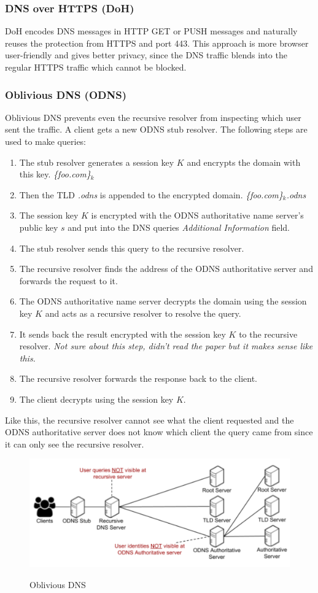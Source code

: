 \subsubsection{DNS over HTTPS (DoH)}
DoH encodes DNS messages in HTTP GET or PUSH messages and naturally reuses the protection from HTTPS and port 443. This approach is more browser user-friendly and gives better privacy, since the DNS traffic blends into the regular HTTPS traffic which cannot be blocked.

\subsubsection{Oblivious DNS (ODNS)}
Oblivious DNS prevents even the recursive resolver from inspecting which user sent the traffic. A client gets a new ODNS stub resolver. The following steps are used to make queries:
\begin{enumerate}
\item The stub resolver generates a session key $K$ and encrypts the domain with this key. \textit{\{foo.com\}$_k$}
\item Then the TLD \textit{.odns} is appended to the encrypted domain. \textit{\{foo.com\}$_k$.odns}
\item The session key $K$ is encrypted with the ODNS authoritative name server's public key $s$ and put into the DNS queries \textit{Additional Information} field.
\item The stub resolver sends this query to the recursive resolver.
\item The recursive resolver finds the address of the ODNS authoritative server and forwards the request to it.
\item The ODNS authoritative name server decrypts the domain using the session key $K$ and acts as a recursive resolver to resolve the query.
\item It sends back the result encrypted with the session key $K$ to the recursive resolver. \textit{Not sure about this step, didn't read the paper but it makes sense like this.}
\item The recursive resolver forwards the response back to the client.
\item The client decrypts using the session key $K$.
\end{enumerate}
Like this, the recursive resolver cannot see what the client requested and the ODNS authoritative server does not know which client the query came from since it can only see the recursive resolver.
\begin{figure}[H]
\centering
\includegraphics[width=.6\textwidth]{images/odns.PNG}
\label{odns}
\caption{Oblivious DNS}
\end{figure}


